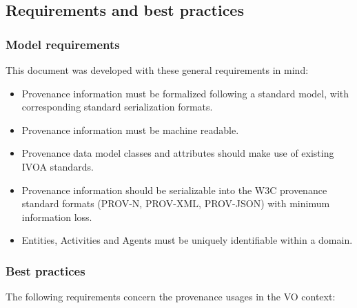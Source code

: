 \subsection{Requirements and best practices}
\label{sec:requirements}

\subsubsection{Model requirements}

This document was developed with these general requirements in mind:

\begin{itemize}


\item Provenance information must be formalized following a standard model, with corresponding standard serialization formats.

\item Provenance information must be machine readable.

\item Provenance data model classes and attributes should make use of existing IVOA standards.

\item Provenance information should be serializable into the W3C provenance standard formats (PROV-N, PROV-XML, PROV-JSON) with minimum information loss.

\item Entities, Activities and Agents must be uniquely identifiable within a domain.

\end{itemize}


\subsubsection{Best practices}

The following requirements concern the provenance usages in the VO context:

